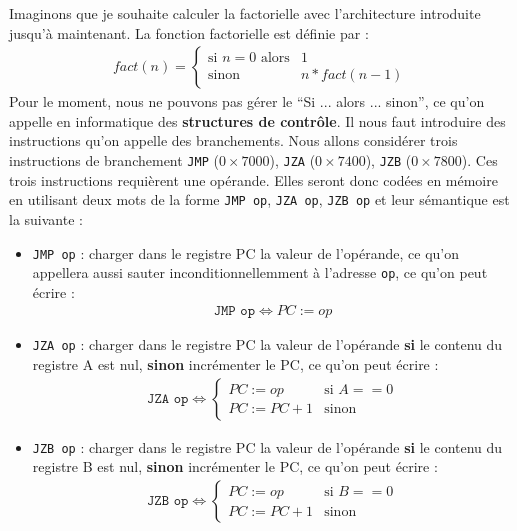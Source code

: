 Imaginons que je souhaite calculer la factorielle avec l'architecture introduite jusqu'à maintenant. La fonction factorielle est définie par :
\begin{eqnarray*}
fact(n) = \begin{cases}
\mbox{si } n=0 \mbox{ alors}& 1\\
\mbox{sinon }& n * fact(n-1)
\end{cases}
\end{eqnarray*}
Pour le moment, nous ne pouvons pas gérer le ``Si ... alors ... sinon'', ce qu'on appelle en informatique des \textbf{structures de contrôle}. Il nous faut introduire des instructions qu'on appelle des branchements. Nous allons considérer trois instructions de branchement \texttt{JMP} ($0\times7000$), \texttt{JZA}  ($0\times7400$), \texttt{JZB}  ($0\times7800$). Ces trois instructions requièrent une opérande. Elles seront donc codées en mémoire en utilisant deux mots de la forme \texttt{JMP op}, \texttt{JZA op}, \texttt{JZB op} et leur sémantique est la suivante :
\begin{itemize}
\item \texttt{JMP op} : charger dans le registre PC la valeur de l'opérande, ce qu'on appellera aussi sauter inconditionnellemment à l'adresse \texttt{op}, ce qu'on peut écrire :
\begin{eqnarray*}
\texttt{JMP op} \Leftrightarrow PC := op
\end{eqnarray*}
\item \texttt{JZA op} : charger dans le registre PC la valeur de l'opérande \textbf{si} le contenu du registre A est nul, \textbf{sinon} incrémenter le PC, ce qu'on peut écrire :
\begin{eqnarray*}
\texttt{JZA op}  \Leftrightarrow \begin{cases}
PC := op & \mbox{si } A==0\\
PC := PC+1 & \mbox{sinon}
\end{cases}
\end{eqnarray*}
\item \texttt{JZB op} : charger dans le registre PC la valeur de l'opérande \textbf{si} le contenu du registre B est nul, \textbf{sinon} incrémenter le PC, ce qu'on peut écrire :
\begin{eqnarray*}
\texttt{JZB op}  \Leftrightarrow \begin{cases}
PC := op & \mbox{si } B==0\\
PC := PC+1 & \mbox{sinon}
\end{cases}
\end{eqnarray*}
\end{itemize}

